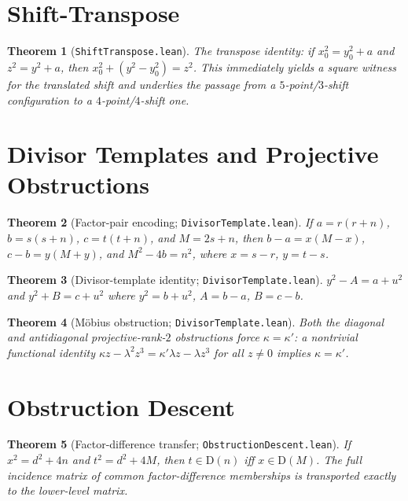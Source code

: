 \documentclass[11pt,a4paper]{article}
\newtheorem{theorem}{Theorem}[section]
\theoremstyle{definition}
\theoremstyle{remark}
\newcommand{\factorDiff}{\mathrm{D}}
\begin{document}
\section{Shift-Transpose}\label{sec:shift-transpose}

\begin{theorem}[\texttt{ShiftTranspose.lean}]
The transpose identity: if $x_0^2=y_0^2+a$ and $z^2=y^2+a$, then
$x_0^2+(y^2-y_0^2)=z^2$.  This immediately yields a square witness
for the translated shift and underlies the passage from a
$5$-point/$3$-shift configuration to a $4$-point/$4$-shift one.
\end{theorem}

\section{Divisor Templates and Projective Obstructions}\label{sec:divisor}

\begin{theorem}[Factor-pair encoding; \texttt{DivisorTemplate.lean}]
If $a=r(r+n)$, $b=s(s+n)$, $c=t(t+n)$, and $M=2s+n$, then
$b-a = x(M-x)$, $c-b = y(M+y)$, and $M^2-4b=n^2$,
where $x=s-r$, $y=t-s$.
\end{theorem}

\begin{theorem}[Divisor-template identity; \texttt{DivisorTemplate.lean}]
$y^2-A = a+u^2$ and $y^2+B = c+u^2$ where $y^2=b+u^2$, $A=b-a$, $B=c-b$.
\end{theorem}

\begin{theorem}[M\"obius obstruction; \texttt{DivisorTemplate.lean}]
Both the diagonal and antidiagonal projective-rank-$2$ obstructions
force $\kappa=\kappa'$: a nontrivial functional identity
$\kappa z - \lambda^2 z^3 = \kappa'\lambda z - \lambda z^3$ for all
$z\ne 0$ implies $\kappa=\kappa'$.
\end{theorem}

\section{Obstruction Descent}\label{sec:descent}

\begin{theorem}[Factor-difference transfer; \texttt{ObstructionDescent.lean}]
If $x^2=d^2+4n$ and $t^2=d^2+4M$, then $t\in\factorDiff(n)$ iff
$x\in\factorDiff(M)$.  The full incidence matrix of common
factor-difference memberships is transported exactly to the lower-level
matrix.
\end{theorem}
\end{document}

